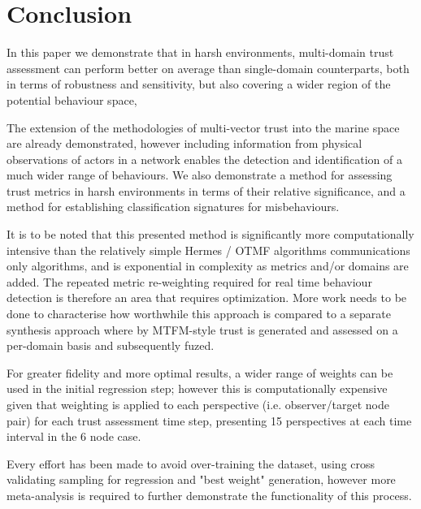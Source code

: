 \section{Conclusion}
In this paper we demonstrate that in harsh environments, multi-domain trust assessment can perform better on average than single-domain counterparts, both in terms of robustness and sensitivity, but also covering a wider region of the potential behaviour space, 

The extension of the methodologies of multi-vector trust into the marine space are already demonstrated, however including information from physical observations of actors in a network enables the detection and identification of a much wider range of behaviours.
We also demonstrate a method for assessing trust metrics in harsh environments in terms of their relative significance, and a method for establishing classification signatures for misbehaviours.

It is to be noted that this presented method is significantly more computationally intensive than the relatively simple Hermes / OTMF algorithms communications only algorithms, and is exponential in complexity as metrics and/or domains are added. The repeated metric re-weighting required for real time behaviour detection is therefore an area that requires optimization. More work needs to be done to characterise how worthwhile this approach is compared to a separate synthesis approach where by MTFM-style trust is generated and assessed on a per-domain basis and subsequently fuzed.

For greater fidelity and more optimal results, a wider range of weights can be used in the initial regression step; however this is computationally expensive given that weighting is applied to each perspective (i.e. observer/target node pair) for each trust assessment time step, presenting 15 perspectives at each time interval in the 6 node case.

Every effort has been made to avoid over-training the dataset, using cross validating sampling for regression and "best weight" generation, however more meta-analysis is required to further demonstrate the functionality of this process.



\ifx\ifthesis\undefined
	
\else
\fi
